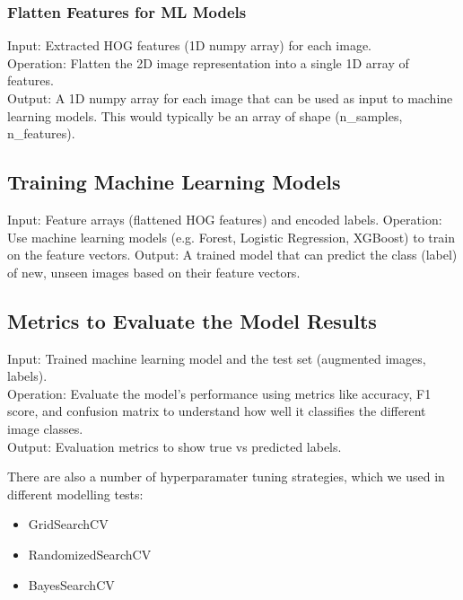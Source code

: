 \documentclass{article}
\begin{document}
\vspace{0.5cm}
    

\subsubsection{Flatten Features for ML Models}\label{flatten_features}
Input: Extracted HOG features (1D numpy array) for each image.\\
Operation: Flatten the 2D image representation into a single 1D array of features.\\
Output: A 1D numpy array for each image that can be used as input to machine learning models. This would typically be an array of shape (n\_samples, n\_features).\\
\subsection{Training Machine Learning Models}\label{train_ML}
Input: Feature arrays (flattened HOG features) and encoded labels.
Operation: Use machine learning models (e.g. Forest, Logistic Regression, XGBoost) to train on the feature vectors.
Output: A trained model that can predict the class (label) of new, unseen images based on their feature vectors.

\subsection{Metrics to Evaluate the Model Results} \label{metrics_ML}
Input: Trained machine learning model and the test set (augmented images, labels).\\
Operation: Evaluate the model's performance using metrics like accuracy, F1 score, and confusion matrix to understand how well it classifies the different 
image classes.\\
Output: Evaluation metrics to show true vs predicted labels.


There are also a number of hyperparamater tuning strategies, which we used in different modelling tests:
\begin{itemize}
    \item GridSearchCV
    \item RandomizedSearchCV
    \item BayesSearchCV
\end{itemize}
\end{document}
